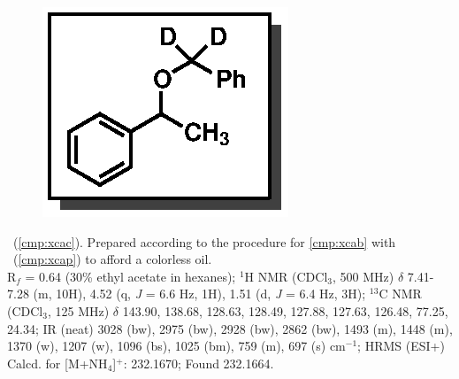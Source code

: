 \vspace{10pt}
\begin{figure}
  \vspace{-22pt}
  \begin{center}
    \includegraphics[scale=0.8]{chp_alkylation/images/xcac}
  \end{center}
  \vspace{-30pt}
\end{figure}
\noindent \textbf{\CMPxcac}\ (\ref{cmp:xcac}). Prepared according to the procedure for
\ref{cmp:xcab} with \CMPxcap~(\ref{cmp:xcap}) to afford a colorless oil.\\
R$_f$ = 0.64 (30\% ethyl acetate in hexanes); 
$^1$H NMR (CDCl$_3$, 500 MHz) $\delta$ 7.41-7.28 (m, 10H), 4.52 (q, \textit{J} = 6.6 Hz, 1H), 1.51
(d, \textit{J} = 6.4 Hz, 3H); $^{13}$C NMR (CDCl$_3$, 125 MHz) $\delta$ 143.90, 138.68, 128.63,
128.49, 127.88, 127.63, 126.48, 77.25, 24.34; IR (neat) 3028 (bw), 2975 (bw), 2928 (bw), 2862 (bw), 1493 (m), 1448 (m), 1370 (w),
1207 (w), 1096 (bs), 1025 (bm), 759 (m), 697 (s) cm$^{-1}$; HRMS (ESI+) Calcd. for 
[M+NH$_4$]$^+$:
232.1670; Found 232.1664.

